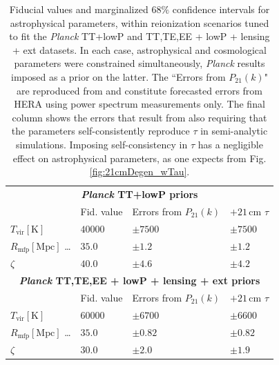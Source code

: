\documentclass[twocolumn,aps,prd,nofootinbib,showpacs]{revtex4-1}
\begin{document}
\begin{table}
\caption{\label{tab:AstroParams} Fiducial values and marginalized $68\%$ confidence intervals for astrophysical parameters, within reionization scenarios tuned to fit the \emph{Planck} TT+lowP and TT,TE,EE + lowP + lensing + ext datasets. In each case, astrophysical and cosmological parameters were constrained simultaneously, \emph{Planck} results imposed as a prior on the latter. The ``Errors from $P_{21}(k)$" are reproduced from \cite{Liu_in_prep} and constitute forecasted errors from HERA using power spectrum measurements only. The final column shows the errors that result from also requiring that the parameters self-consistently reproduce $\tau$ in semi-analytic simulations. Imposing self-consistency in $\tau$ has a negligible effect on astrophysical parameters, as one expects from Fig. \ref{fig:21cmDegen_wTau}.}
\begin{ruledtabular}
\begin{tabular}{llll}
\multicolumn{4}{c}{   \textbf{\emph{Planck} TT+lowP priors} }  \\
& Fid. value & Errors from  $P_{21} (k)$ & $+21\,\textrm{cm}$ $\tau$\\
\hline
$T_\textrm{vir}\left[ \textrm{K} \right]$  \dotfill & $40000$ & $\pm 7500$ & $\pm 7500$ \\
 $R_\textrm{mfp}\left[ \textrm{Mpc} \right]$ \dots \dotfill & $35.0$ & $\pm1.2$ & $\pm1.2$ \\
$\zeta$ \dotfill& $40.0$ & $\pm 4.6$ & $\pm 4.2$ \\
\hline 
\multicolumn{4}{c}{    \textbf{\emph{Planck} TT,TE,EE + lowP + lensing + ext priors} }  \\
& Fid. value & Errors from  $P_{21} (k)$  & $+21\,\textrm{cm}$ $\tau$\\
\hline
$T_\textrm{vir}\left[ \textrm{K} \right]$  \dotfill & $60000$ & $\pm 6700$ & $\pm 6600$ \\
$R_\textrm{mfp}\left[ \textrm{Mpc} \right]$ \dots \dotfill & $35.0$ & $\pm 0.82$ & $\pm 0.82$ \\
$\zeta$ \dotfill& $30.0$ & $\pm 2.0$ & $\pm 1.9$\\
\end{tabular}
\end{ruledtabular}
\end{table}
\end{document}
